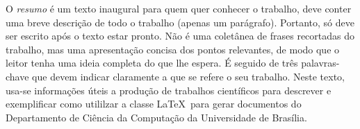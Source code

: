 O \emph{resumo} é um texto inaugural para quem quer conhecer o trabalho, deve conter 
uma breve descrição de todo o trabalho (apenas um parágrafo). Portanto, só deve 
ser escrito após o texto estar pronto. Não é uma coletânea de frases recortadas 
do trabalho, mas uma apresentação concisa dos pontos relevantes, de modo que o
leitor tenha uma ideia completa do que lhe espera. É seguido de três palavras-chave 
que devem indicar claramente a que se refere o seu trabalho. Neste texto, usa-se
informações úteis a produção de trabalhos científicos para descrever e exemplificar 
como utililzar a classe \LaTeX\ para gerar documentos do Departamento de Ciência 
da Computação da Universidade de Brasília.